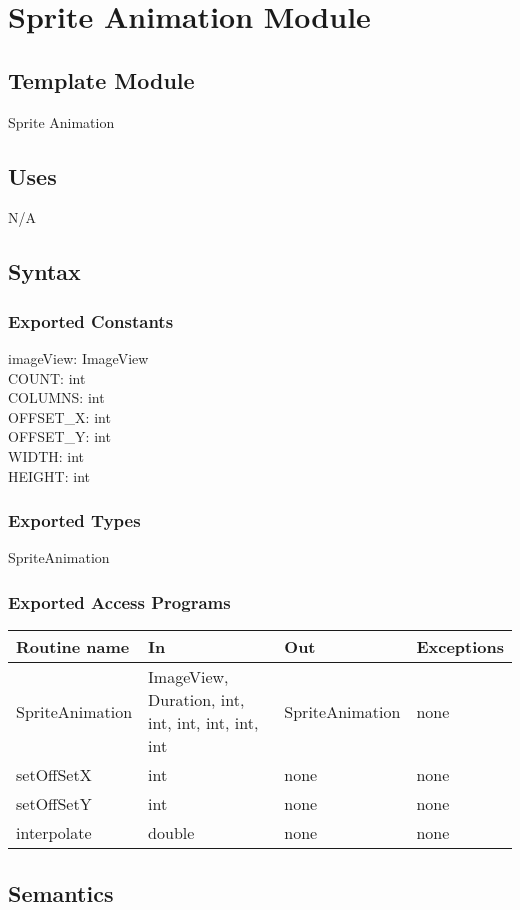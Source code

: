 \documentclass[12pt, titlepage]{article}
\begin{document}
\newpage
\section {Sprite Animation Module}
\subsection{Template Module}
Sprite Animation
\subsection {Uses}
N/A
\subsection {Syntax}
\subsubsection {Exported Constants}
imageView: ImageView\\
COUNT: int\\
COLUMNS: int\\
OFFSET\_X: int\\
OFFSET\_Y: int\\
WIDTH: int\\
HEIGHT: int\\
\subsubsection {Exported Types}
SpriteAnimation 
\subsubsection {Exported Access Programs}
\begin{tabular}{| l | l | l | l |}
\hline
\textbf{Routine name} & \textbf{In} & \textbf{Out} & \textbf{Exceptions}\\
\hline
SpriteAnimation & ImageView, Duration, int, int, int, int, int, int & SpriteAnimation & none\\
\hline
setOffSetX & int & none & none\\
\hline
setOffSetY & int & none & none\\
\hline
interpolate & double & none & none\\
\hline
\end{tabular}
\subsection {Semantics}
\end{document}
